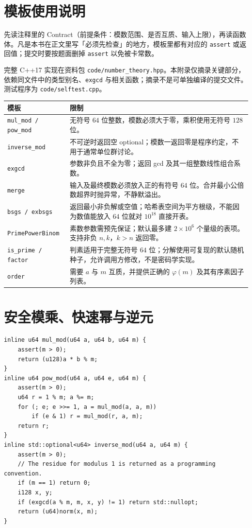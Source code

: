 \documentclass[UTF8,a4paper,11pt,oneside,openany,fontset=fandol]{ctexbook}
\theoremstyle{definition}
\begin{document}
\section{模板使用说明}

\begin{tip}[附录代码怎么读]
先读注释里的 Contract（前提条件：模数范围、是否互质、输入上限），再读函数体。凡是本书在正文里写「必须先检查」的地方，模板里都有对应的 \texttt{assert} 或返回值；提交时要按题面删掉 \texttt{assert} 以免被卡常数。
\end{tip}

完整 C++17 实现在资料包 \texttt{code/number\_theory.hpp}。本附录仅摘录关键部分，依赖同文件中的类型别名、\texttt{exgcd} 与相关函数；摘录不是可单独编译的提交文件。测试程序为 \texttt{code/selftest.cpp}。

\begin{longtable}{p{}p{}}
\toprule
模板 & 限制\\\midrule
\texttt{mul\_mod / pow\_mod} & 无符号 $64$ 位整数，模数必须大于零，乘积使用无符号 $128$ 位。\\
\texttt{inverse\_mod} & 不可逆时返回空 optional；模数一返回零是程序约定，不用于通常单位群讨论。\\
\texttt{exgcd} & 参数非负且不全为零；返回 gcd 及其一组整数线性组合系数。\\
\texttt{merge} & 输入及最终模数必须放入正的有符号 $64$ 位。合并最小公倍数超界时抛异常，不静默溢出。\\
\texttt{bsgs / exbsgs} & 返回最小非负解或空值；哈希表空间为平方根级，不能因为数值能放入 $64$ 位就对 $10^{18}$ 直接开表。\\
\texttt{PrimePowerBinom} & 素数参数需预先保证；默认最多建 $2\times10^6$ 个量级的表项。支持非负 $n,k$，$k>n$ 返回零。\\
\texttt{is\_prime / factor} & 判素适用于完整无符号 $64$ 位；分解使用可复现的默认随机种子，允许调用方修改，不是密码学实现。\\
\texttt{order} & 需要 $a$ 与 $m$ 互质，并提供正确的 $\varphi(m)$ 及其有序素因子列表。\\
\bottomrule
\end{longtable}

\section{安全模乘、快速幂与逆元}
\begin{lstlisting}
inline u64 mul_mod(u64 a, u64 b, u64 m) {
    assert(m > 0);
    return (u128)a * b % m;
}
inline u64 pow_mod(u64 a, u64 e, u64 m) {
    assert(m > 0);
    u64 r = 1 % m; a %= m;
    for (; e; e >>= 1, a = mul_mod(a, a, m))
        if (e & 1) r = mul_mod(r, a, m);
    return r;
}
inline std::optional<u64> inverse_mod(u64 a, u64 m) {
    assert(m > 0);
    // The residue for modulus 1 is returned as a programming convention.
    if (m == 1) return 0;
    i128 x, y;
    if (exgcd(a % m, m, x, y) != 1) return std::nullopt;
    return (u64)norm(x, m);
}
\end{lstlisting}
\end{document}

